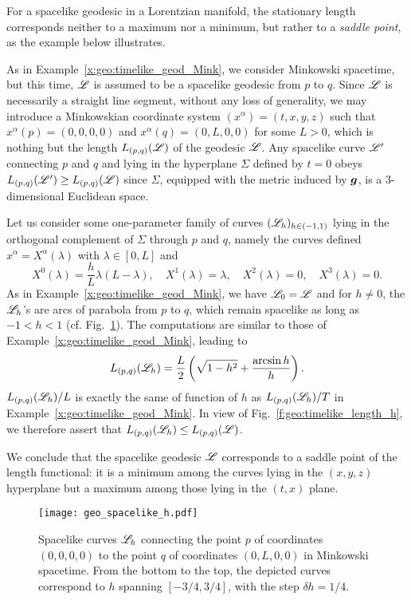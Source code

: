 For a spacelike geodesic in a Lorentzian manifold,
the stationary length corresponds neither to a
maximum nor a minimum, but rather to a \emph{saddle point}, as the example
below illustrates.


\begin{example}
As in Example~\ref{x:geo:timelike_geod_Mink}, we consider Minkowski spacetime,
but this time, $\mathscr{L}$ is assumed to be a spacelike geodesic from $p$ to $q$. Since $\mathscr{L}$ is necessarily a straight line
segment, without any loss of generality, we may introduce a Minkowskian coordinate
system $(x^\alpha)=(t,x,y,z)$ such that $x^\alpha(p) = (0,0,0,0)$ and
$x^\alpha(q) = (0,L,0,0)$ for some $L>0$, which is nothing but the length
$L_{(p,q)}(\mathscr{L})$ of the geodesic $\mathscr{L}$. Any spacelike curve
$\mathscr{L}'$ connecting $p$ and $q$ and lying in the hyperplane $\Sigma$
defined by $t=0$ obeys $L_{(p,q)}(\mathscr{L}') \geq L_{(p,q)}(\mathscr{L})$
since $\Sigma$, equipped with the metric induced by $\bm{g}$, is a
3-dimensional Euclidean space.

Let us consider some one-parameter family of curves
$(\mathscr{L}_h)_{h\in(-1,1)}$ lying in the orthogonal complement of $\Sigma$
through $p$ and $q$, namely the curves defined $x^\alpha = X^\alpha(\lambda)$ with
$\lambda\in[0,L]$ and
\[
   X^0(\lambda) = \frac{h}{L} \lambda(L - \lambda), \quad
   X^1(\lambda) = \lambda, \quad
   X^2(\lambda) = 0, \quad
   X^3(\lambda) = 0 .
\]
As in Example~\ref{x:geo:timelike_geod_Mink}, we have $\mathscr{L}_0=\mathscr{L}$
and for $h\not=0$, the $\mathscr{L}_h$'s are
arcs of parabola from $p$ to $q$, which remain spacelike as long as
$-1<h<1$ (cf. Fig.~\ref{f:geo:spacelike_h}).
The computations are similar to those of Example~\ref{x:geo:timelike_geod_Mink},
leading to
\[
    L_{(p,q)}(\mathscr{L}_h) = \frac{L}{2} \left( \sqrt{1-h^2} + \frac{\mathrm{arcsin}\, h}{h} \right) .
\]
$L_{(p,q)}(\mathscr{L}_h) / L$ is exactly the same of function of $h$
as $L_{(p,q)}(\mathscr{L}_h) / T$ in Example~\ref{x:geo:timelike_geod_Mink}.
In view of Fig.~\ref{f:geo:timelike_length_h}, we therefore assert
that $L_{(p,q)}(\mathscr{L}_h) \leq L_{(p,q)}(\mathscr{L})$.

We conclude that the spacelike geodesic $\mathscr{L}$ corresponds to a
saddle point of the length functional: it is a minimum among the curves lying
in the $(x,y,z)$ hyperplane but a maximum among those lying in the $(t,x)$
plane.
\end{example}

\begin{figure}
\centerline{\texttt{[image: geo\_spacelike\_h.pdf]}}
\caption[]{\label{f:geo:spacelike_h} \footnotesize
Spacelike curves $\mathscr{L}_h$ connecting the point $p$
of coordinates $(0,0,0,0)$ to the point $q$ of coordinates $(0,L,0,0)$
in Minkowski spacetime. From the bottom to the top, the depicted curves
correspond to $h$ spanning $[-3/4, 3/4]$, with the step $\delta h = 1/4$.}
\end{figure}


